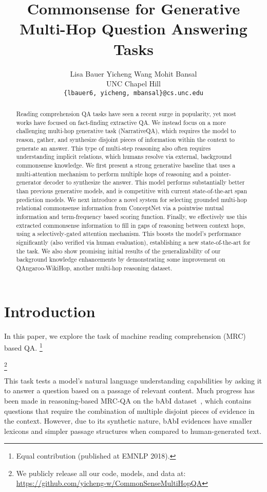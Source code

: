 \documentclass[11pt,a4paper]{article}
\title{Commonsense for Generative Multi-Hop Question Answering Tasks}
\author{Lisa Bauer \;\;\;\;\;\;\; Yicheng Wang \;\;\;\;\;\;\; Mohit Bansal \\
  UNC Chapel Hill \\
  {\tt \{lbauer6, yicheng, mbansal\}@cs.unc.edu} \\
 }
\date{}
\newcommand\blfootnote[1]{\begingroup
  \renewcommand\thefootnote{}\footnote{#1}\addtocounter{footnote}{-1}\endgroup
}
\begin{document}
\maketitle
\begin{abstract}

Reading comprehension QA tasks have seen a recent surge in popularity, yet most works have focused on fact-finding extractive QA. We instead focus on a more challenging multi-hop generative task (NarrativeQA), which requires the model to reason, gather, and synthesize disjoint pieces of information within the context to generate an answer.
This type of multi-step reasoning also often requires understanding implicit relations, which humans resolve via  external, background commonsense knowledge.
We first present a strong generative baseline that uses a multi-attention mechanism to perform multiple hops of reasoning and a pointer-generator decoder to synthesize the answer. This model performs substantially better than previous generative models, and is competitive with current state-of-the-art span prediction models. We next introduce a novel system for selecting grounded multi-hop relational commonsense information from ConceptNet via a pointwise mutual information and term-frequency based scoring function.
Finally, we effectively use this extracted commonsense information to fill in gaps of reasoning between context hops, using a selectively-gated attention mechanism.
This boosts the model's performance significantly (also verified via human evaluation), establishing a new state-of-the-art for the task. 
We also show promising initial results of the generalizability of our background knowledge enhancements by demonstrating some improvement on QAngaroo-WikiHop, another multi-hop reasoning dataset.


\end{abstract}

\section{Introduction}
In this paper, we explore the task of machine reading comprehension (MRC) based QA.\blfootnote{ Equal contribution (published at EMNLP 2018).}\blfootnote{We publicly release all our code, models, and data at: \scriptsize{\url{https://github.com/yicheng-w/CommonSenseMultiHopQA}}}
This task tests a model's natural language understanding capabilities by asking it to answer a question based on a passage of relevant content.
Much progress has been made in reasoning-based MRC-QA on the bAbI dataset~\cite{Babi},
which contains questions that require
the combination of multiple disjoint pieces of evidence in the context.
However, due to its synthetic nature, bAbI evidences have smaller lexicons and simpler passage structures when compared to human-generated text.
\end{document}
